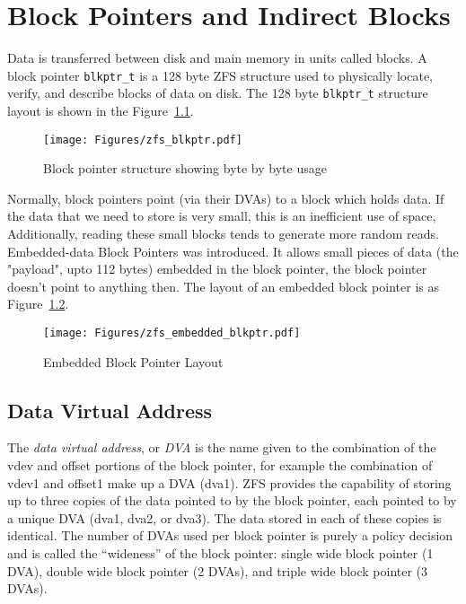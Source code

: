 \chapter{Block Pointers and Indirect Blocks}\label{chap:blkptr}

Data is transferred between disk and main memory in units called blocks.
A block pointer \lstinline{blkptr_t} is a 128 byte ZFS structure used
to physically locate, verify, and describe blocks of data on disk.
The 128 byte \lstinline{blkptr_t} structure layout is shown in the
Figure~\ref{fig:blkptr}.

\begin{figure}[ht!]
  \centering
  \texttt{[image: Figures/zfs\_blkptr.pdf]}
  \caption{Block pointer structure showing byte by byte usage}
  \label{fig:blkptr}
\end{figure}

Normally,
block pointers point (via their DVAs) to a block which holds data.
If the data that we need to store is very small,
this is an inefficient use of space,
Additionally, reading these small blocks tends to generate
more random reads.
Embedded-data Block Pointers was introduced.
It allows small pieces of data
(the "payload", upto 112 bytes) embedded in the block pointer,
the block pointer doesn't point to anything then.
The layout of an embedded block pointer is as Figure~\ref{fig:embedded}.

\begin{figure}[ht]
  \centering
  \texttt{[image: Figures/zfs\_embedded\_blkptr.pdf]}
  \caption{Embedded Block Pointer Layout}
  \label{fig:embedded}
\end{figure}

\section{Data Virtual Address}

The \emph{data virtual address}, or \emph{DVA} is the name
given to the combination of the vdev and offset portions of the block pointer,
for example the combination of vdev1 and offset1 make up a DVA (dva1).
ZFS provides the capability of storing up to three copies of the data pointed to by the block pointer,
each pointed to by a unique DVA (dva1, dva2, or dva3).
The data stored in each of these copies is identical.
The number of DVAs used per block pointer is purely a policy decision
and is called the “wideness” of the block pointer:
single wide block pointer (1 DVA),
double wide block pointer (2 DVAs),
and triple wide block pointer (3 DVAs).


